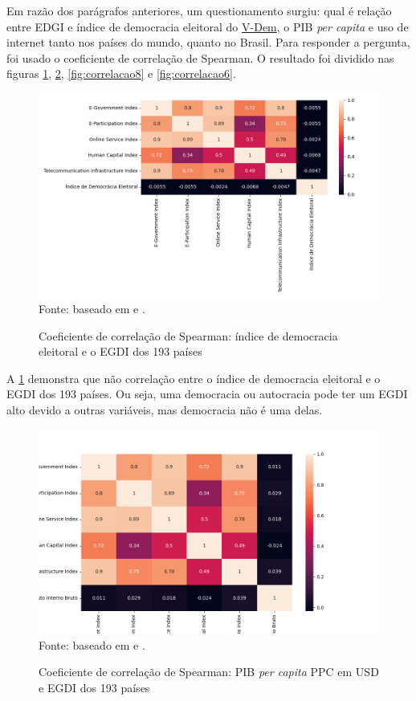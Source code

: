 Em razão dos parágrafos anteriores, um questionamento surgiu: qual é relação entre EDGI e índice de democracia eleitoral do \href{https://www.v-dem.net/}{V-Dem}, o PIB \textit{per capita} e uso de internet tanto nos países do mundo, quanto no Brasil. Para responder a pergunta, foi usado o coeficiente de correlação de Spearman. O resultado foi dividido nas figuras \ref{fig:correlacao3}, \ref{fig:correlacao4}, \ref{fig:correlacao8} e \ref{fig:correlacao6}.

\begin{figure}[H]
    \centering
    \caption{Coeficiente de correlação de Spearman: índice de democracia eleitoral e o EGDI dos 193 países}
    \includegraphics[width=1\linewidth]{figuras/egdi/correlacao3.png}
    \label{fig:correlacao3}
    \footnotesize{Fonte: baseado em \cite{ONU_edgi_mapa} e \cite{electoral_democracy_index}.}
\end{figure}

A \ref{fig:correlacao3} demonstra que não correlação entre o índice de democracia eleitoral e o EGDI dos 193 países. Ou seja, uma democracia ou autocracia pode ter um EGDI alto devido a outras variáveis, mas democracia não é uma delas.

\begin{figure}[H]
    \centering
    \caption{Coeficiente de correlação de Spearman: PIB \textit{per capita} PPC em USD e EGDI dos 193 países}
    \includegraphics[width=1\linewidth]{figuras/egdi/correlacao4.png}
    \label{fig:correlacao4}
    \footnotesize{Fonte: baseado em \cite{ONU_edgi_mapa} e \cite{WB_pib_per_capita_países}.}
\end{figure}

